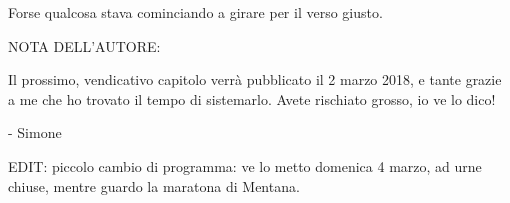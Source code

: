 Forse qualcosa stava cominciando a girare per il verso giusto.


NOTA DELL'AUTORE:

Il prossimo, vendicativo capitolo verrà pubblicato il 2 marzo 2018, e tante grazie a me che ho trovato il tempo di sistemarlo. Avete rischiato grosso, io ve lo dico!

- Simone

EDIT: piccolo cambio di programma: ve lo metto domenica 4 marzo, ad urne chiuse, mentre guardo la maratona di Mentana.



